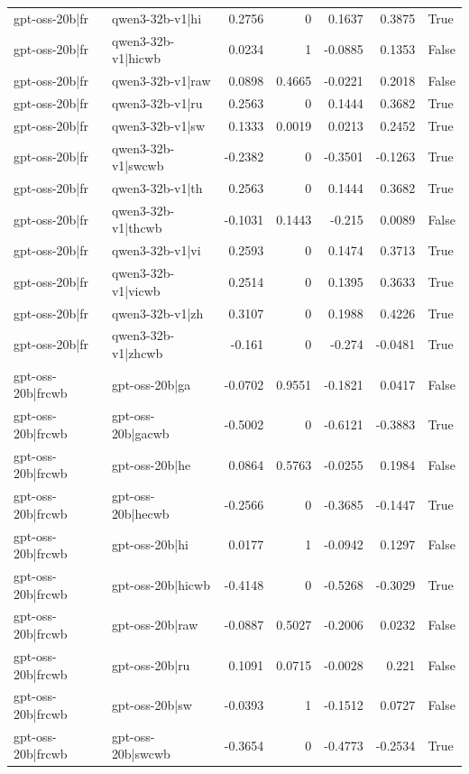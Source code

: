 \begin{table}
\begin{tabular}{l l r r r r l}
gpt-oss-20b|fr & qwen3-32b-v1|hi & 0.2756 & 0 & 0.1637 & 0.3875 & True \\
gpt-oss-20b|fr & qwen3-32b-v1|hicwb & 0.0234 & 1 & -0.0885 & 0.1353 & False \\
gpt-oss-20b|fr & qwen3-32b-v1|raw & 0.0898 & 0.4665 & -0.0221 & 0.2018 & False \\
gpt-oss-20b|fr & qwen3-32b-v1|ru & 0.2563 & 0 & 0.1444 & 0.3682 & True \\
gpt-oss-20b|fr & qwen3-32b-v1|sw & 0.1333 & 0.0019 & 0.0213 & 0.2452 & True \\
gpt-oss-20b|fr & qwen3-32b-v1|swcwb & -0.2382 & 0 & -0.3501 & -0.1263 & True \\
gpt-oss-20b|fr & qwen3-32b-v1|th & 0.2563 & 0 & 0.1444 & 0.3682 & True \\
gpt-oss-20b|fr & qwen3-32b-v1|thcwb & -0.1031 & 0.1443 & -0.215 & 0.0089 & False \\
gpt-oss-20b|fr & qwen3-32b-v1|vi & 0.2593 & 0 & 0.1474 & 0.3713 & True \\
gpt-oss-20b|fr & qwen3-32b-v1|vicwb & 0.2514 & 0 & 0.1395 & 0.3633 & True \\
gpt-oss-20b|fr & qwen3-32b-v1|zh & 0.3107 & 0 & 0.1988 & 0.4226 & True \\
gpt-oss-20b|fr & qwen3-32b-v1|zhcwb & -0.161 & 0 & -0.274 & -0.0481 & True \\
gpt-oss-20b|frcwb & gpt-oss-20b|ga & -0.0702 & 0.9551 & -0.1821 & 0.0417 & False \\
gpt-oss-20b|frcwb & gpt-oss-20b|gacwb & -0.5002 & 0 & -0.6121 & -0.3883 & True \\
gpt-oss-20b|frcwb & gpt-oss-20b|he & 0.0864 & 0.5763 & -0.0255 & 0.1984 & False \\
gpt-oss-20b|frcwb & gpt-oss-20b|hecwb & -0.2566 & 0 & -0.3685 & -0.1447 & True \\
gpt-oss-20b|frcwb & gpt-oss-20b|hi & 0.0177 & 1 & -0.0942 & 0.1297 & False \\
gpt-oss-20b|frcwb & gpt-oss-20b|hicwb & -0.4148 & 0 & -0.5268 & -0.3029 & True \\
gpt-oss-20b|frcwb & gpt-oss-20b|raw & -0.0887 & 0.5027 & -0.2006 & 0.0232 & False \\
gpt-oss-20b|frcwb & gpt-oss-20b|ru & 0.1091 & 0.0715 & -0.0028 & 0.221 & False \\
gpt-oss-20b|frcwb & gpt-oss-20b|sw & -0.0393 & 1 & -0.1512 & 0.0727 & False \\
gpt-oss-20b|frcwb & gpt-oss-20b|swcwb & -0.3654 & 0 & -0.4773 & -0.2534 & True \\

\end{tabular}
\end{table}
